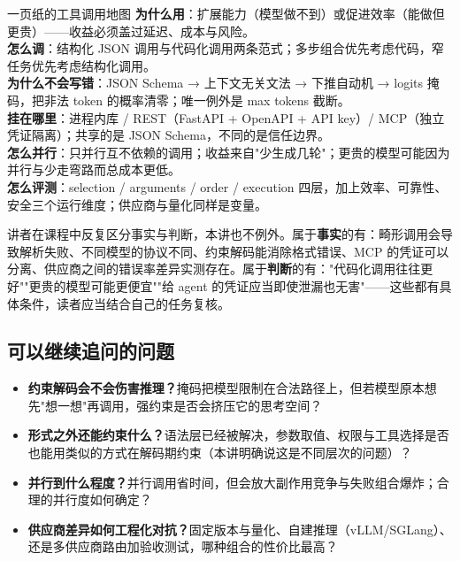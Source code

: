 \documentclass[a4paper]{article}
\begin{document}
\begin{importantbox}{一页纸的工具调用地图}
\textbf{为什么用}：扩展能力（模型做不到）或促进效率（能做但更贵）——收益必须盖过延迟、成本与风险。\\
\textbf{怎么调}：结构化 JSON 调用与代码化调用两条范式；多步组合优先考虑代码，窄任务优先考虑结构化调用。\\
\textbf{为什么不会写错}：JSON Schema → 上下文无关文法 → 下推自动机 → logits 掩码，把非法 token 的概率清零；唯一例外是 max tokens 截断。\\
\textbf{挂在哪里}：进程内库 / REST（FastAPI + OpenAPI + API key）/ MCP（独立凭证隔离）；共享的是 JSON Schema，不同的是信任边界。\\
\textbf{怎么并行}：只并行互不依赖的调用；收益来自"少生成几轮"；更贵的模型可能因为并行与少走弯路而总成本更低。\\
\textbf{怎么评测}：selection / arguments / order / execution 四层，加上效率、可靠性、安全三个运行维度；供应商与量化同样是变量。
\end{importantbox}

讲者在课程中反复区分事实与判断，本讲也不例外。属于\textbf{事实}的有：畸形调用会导致解析失败、不同模型的协议不同、约束解码能消除格式错误、MCP 的凭证可以分离、供应商之间的错误率差异实测存在。属于\textbf{判断}的有："代码化调用往往更好""更贵的模型可能更便宜""给 agent 的凭证应当即使泄漏也无害"——这些都有具体条件，读者应当结合自己的任务复核。

\subsection{可以继续追问的问题}

\begin{itemize}
\item \textbf{约束解码会不会伤害推理？}掩码把模型限制在合法路径上，但若模型原本想先"想一想"再调用，强约束是否会挤压它的思考空间？
\item \textbf{形式之外还能约束什么？}语法层已经被解决，参数取值、权限与工具选择是否也能用类似的方式在解码期约束（本讲明确说这是不同层次的问题）？
\item \textbf{并行到什么程度？}并行调用省时间，但会放大副作用竞争与失败组合爆炸；合理的并行度如何确定？
\item \textbf{供应商差异如何工程化对抗？}固定版本与量化、自建推理（vLLM/SGLang）、还是多供应商路由加验收测试，哪种组合的性价比最高？
\end{itemize}
\end{document}
